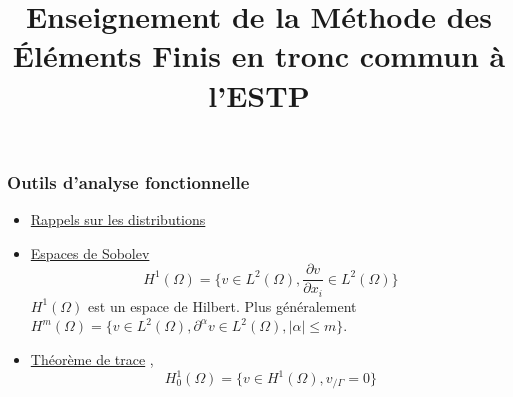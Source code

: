 \documentclass{article}
\title{Enseignement de la Méthode des Éléments Finis en tronc commun à l'ESTP}
\begin{document}
  \lstset{
    frame       = single,
    numbers     = left,
    showspaces  = false,
    showstringspaces    = false,
    captionpos  = t,
    caption     = \lstname
}
\maketitle
\subsubsection*{Outils d'analyse fonctionnelle }
\begin{itemize}[label=\textbullet, font=\small \color{blue}]
\item \underline{Rappels sur les distributions}
\item \underline{Espaces de Sobolev}
\[H^1(\Omega)=\{v\in L^2(\Omega), \frac{\partial v}{\partial x_i} \in L^2(\Omega)\}\]
$H^1(\Omega)$ est un espace de Hilbert. Plus généralement $H^m(\Omega)=\{v\in L^2(\Omega), \partial^\alpha v\in L^2(\Omega), |\alpha|\leq m\}$.
 \item \underline{Théorème de trace} , \[H_0^1(\Omega)=\{v\in H^1(\Omega), v_{/\Gamma}=0\}\]
\end{itemize}
\end{document}
